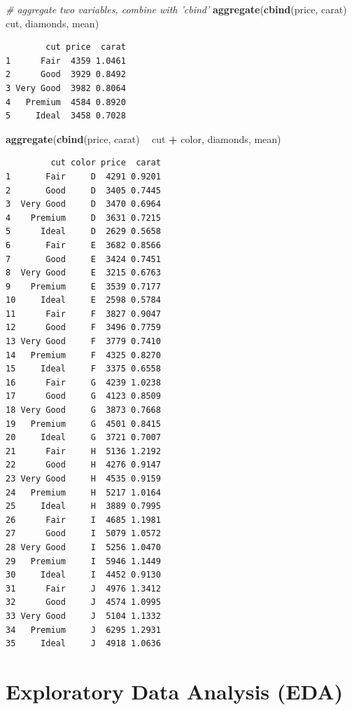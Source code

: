 \documentclass[
]{book}
\newenvironment{Shaded}{\begin{snugshade}}{\end{snugshade}}
\newcommand{\CommentTok}[1]{\textcolor[rgb]{0.56,0.35,0.01}{\textit{#1}}}
\newcommand{\KeywordTok}[1]{\textcolor[rgb]{0.13,0.29,0.53}{\textbf{#1}}}
\newcommand{\NormalTok}[1]{#1}
\newcommand{\OperatorTok}[1]{\textcolor[rgb]{0.81,0.36,0.00}{\textbf{#1}}}
\newcommand{\StringTok}[1]{\textcolor[rgb]{0.31,0.60,0.02}{#1}}
\begin{document}
\begin{Shaded}
\begin{Highlighting}[]
\CommentTok{# aggregate two variables, combine with 'cbind'}
\KeywordTok{aggregate}\NormalTok{(}\KeywordTok{cbind}\NormalTok{(price, carat) }\OperatorTok{~}\StringTok{ }\NormalTok{cut, diamonds, mean)}
\end{Highlighting}
\end{Shaded}

\begin{verbatim}
        cut price  carat
1      Fair  4359 1.0461
2      Good  3929 0.8492
3 Very Good  3982 0.8064
4   Premium  4584 0.8920
5     Ideal  3458 0.7028
\end{verbatim}

\begin{Shaded}
\begin{Highlighting}[]
\KeywordTok{aggregate}\NormalTok{(}\KeywordTok{cbind}\NormalTok{(price, carat) }\OperatorTok{~}\StringTok{ }\NormalTok{cut }\OperatorTok{+}\StringTok{ }\NormalTok{color, diamonds, mean)}
\end{Highlighting}
\end{Shaded}

\begin{verbatim}
         cut color price  carat
1       Fair     D  4291 0.9201
2       Good     D  3405 0.7445
3  Very Good     D  3470 0.6964
4    Premium     D  3631 0.7215
5      Ideal     D  2629 0.5658
6       Fair     E  3682 0.8566
7       Good     E  3424 0.7451
8  Very Good     E  3215 0.6763
9    Premium     E  3539 0.7177
10     Ideal     E  2598 0.5784
11      Fair     F  3827 0.9047
12      Good     F  3496 0.7759
13 Very Good     F  3779 0.7410
14   Premium     F  4325 0.8270
15     Ideal     F  3375 0.6558
16      Fair     G  4239 1.0238
17      Good     G  4123 0.8509
18 Very Good     G  3873 0.7668
19   Premium     G  4501 0.8415
20     Ideal     G  3721 0.7007
21      Fair     H  5136 1.2192
22      Good     H  4276 0.9147
23 Very Good     H  4535 0.9159
24   Premium     H  5217 1.0164
25     Ideal     H  3889 0.7995
26      Fair     I  4685 1.1981
27      Good     I  5079 1.0572
28 Very Good     I  5256 1.0470
29   Premium     I  5946 1.1449
30     Ideal     I  4452 0.9130
31      Fair     J  4976 1.3412
32      Good     J  4574 1.0995
33 Very Good     J  5104 1.1332
34   Premium     J  6295 1.2931
35     Ideal     J  4918 1.0636
\end{verbatim}

\hypertarget{exploratory-data-analysis-eda}{%
\section{Exploratory Data Analysis (EDA)}\label{exploratory-data-analysis-eda}}
\end{document}
